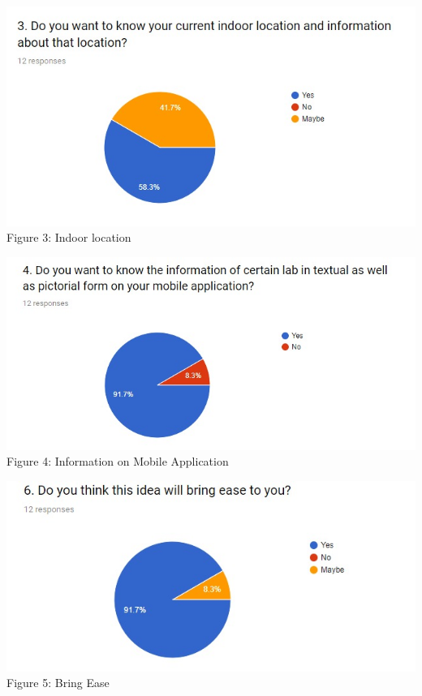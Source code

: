 \documentclass{article}
\begin{document}
\begin{center}
\includegraphics[scale=0.7]{graph3}
\\Figure 3: Indoor location
\end{center}

\begin{center}
\includegraphics[scale=0.7]{graph4}
\\Figure 4: Information on Mobile Application
\end{center}

\begin{center}
\includegraphics[scale=0.7]{graph6}
\\Figure 5: Bring Ease
\end{center}
\end{document}
